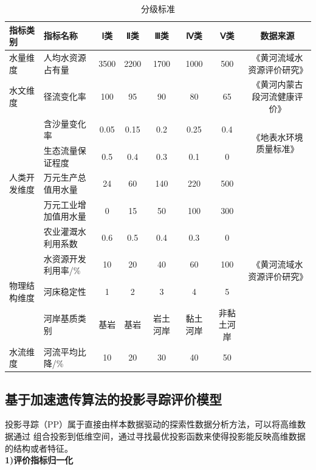 \documentclass{whutmod}
\begin{document}
\begin{spacing}{1.2}
\begin{table}[H]
	\centering
	\caption{分级标准}\scriptsize
    \begin{tabular}{p{4.19em}p{10.44em}cccccc}\toprule[1.5pt]
		指标类别 & 指标名称 & \multicolumn{1}{p{4.94em}}{Ⅰ类} & \multicolumn{1}{p{4.94em}}{Ⅱ类} & \multicolumn{1}{p{4.94em}}{Ⅲ类} & \multicolumn{1}{p{4.94em}}{Ⅳ类} & \multicolumn{1}{p{4.94em}}{Ⅴ类} & \multicolumn{1}{p{8.065em}}{数据来源} \\ \hline
		水量维度 & 人均水资源占有量 & 3500 & 2200 & 1700 & 1000 & 500 & \multicolumn{1}{p{8.065em}}{《黄河流域水资源评价研究》} \\ \hline
		水文维度 & 径流变化率 & 100 & 95  & 90  & 80  & 65  & \multicolumn{1}{p{8.065em}}{《黄河内蒙古段河流健康评价》} \\ \hline
		\multicolumn{1}{c}{} & 含沙量变化率 & 0.05 & 0.15 & 0.2 & 0.25 & 0.4 & \multicolumn{1}{c}{\multirow{2}[0]{*}{《地表水环境质量标准》}} \\ 
		\multicolumn{1}{c}{} & 生态流量保证程度 & 0.5 & 0.4 & 0.3 & 0.1 & 0   &  \\\hline
		人类开发维度 & 万元生产总值用水量 & 24  & 60  & 140 & 220 & 500 & \multicolumn{1}{c}{\multirow{7}[0]{*}{《黄河流域水资源评价研究》}} \\
		\multicolumn{1}{c}{} & 万元工业增加值用水量 & 0   & 15  & 50  & 100 & 300 &  \\
		\multicolumn{1}{c}{} & 农业灌溉水利用系数 & 0.6 & 0.5 & 0.4 & 0.3 & 0   &  \\
		\multicolumn{1}{c}{} & 水资源开发利用率/\% & 10  & 20  & 40  & 60  & 100 &  \\
		物理结构维度 & 河床稳定性 & 1   & 2   & 3   & 4   & 5   &  \\
		\multicolumn{1}{c}{} & 河岸基质类别 & \multicolumn{1}{p{4.94em}}{基岩} & \multicolumn{1}{p{4.94em}}{基岩} & \multicolumn{1}{p{4.94em}}{岩土河岸} & \multicolumn{1}{p{4.94em}}{黏土河岸} & \multicolumn{1}{p{4.94em}}{非黏土河岸} &  \\
		水流维度 & 河流平均比降/\% & 10  & 20  & 30  & 40  & 50  &  \\\bottomrule[1.5pt]
		\end{tabular}%
	\label{分级}%
\end{table}%

\subsection{基于加速遗传算法的投影寻踪评价模型}
投影寻踪（PP）属于直接由样本数据驱动的探索性数据分析方法，可以将高维数据通过
组合投影到低维空间，通过寻找最优投影函数来使得投影能反映高维数据的结构或者特征。
~\\
\textbf{1)评价指标归一化}


\end{spacing}
\end{document}
